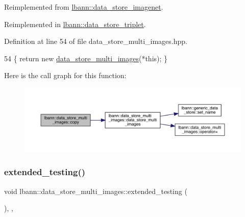 Reimplemented from \hyperlink{classlbann_1_1data__store__imagenet_ae3b0d31ac020c36f41766999288e2d25}{lbann\+::data\+\_\+store\+\_\+imagenet}.



Reimplemented in \hyperlink{classlbann_1_1data__store__triplet_a446ee3b1fa3097e51bd0e198de960cd4}{lbann\+::data\+\_\+store\+\_\+triplet}.



Definition at line 54 of file data\+\_\+store\+\_\+multi\+\_\+images.\+hpp.


\begin{DoxyCode}
54 \{ \textcolor{keywordflow}{return} \textcolor{keyword}{new} \hyperlink{classlbann_1_1data__store__multi__images_a1ad4fbec5c15f98422ebf7027f3a1d8a}{data\_store\_multi\_images}(*\textcolor{keyword}{this}); \}
\end{DoxyCode}
Here is the call graph for this function\+:\nopagebreak
\begin{figure}[H]
\begin{center}
\leavevmode
\includegraphics[width=350pt]{classlbann_1_1data__store__multi__images_a1046efda9448bab9b42e9fcdf71e03f1_cgraph}
\end{center}
\end{figure}
\mbox{\label{classlbann_1_1data__store__multi__images_abe17bbf485f6da9d7dfa568e9e74a693}} 
\subsubsection{\texorpdfstring{extended\+\_\+testing()}{extended\_testing()}}
{\footnotesize\ttfamily void lbann\+::data\+\_\+store\+\_\+multi\+\_\+images\+::extended\+\_\+testing (\begin{DoxyParamCaption}{ }\end{DoxyParamCaption})\hspace{0.3cm}{\ttfamily [override]}, {\ttfamily [protected]}, {\ttfamily [virtual]}}



